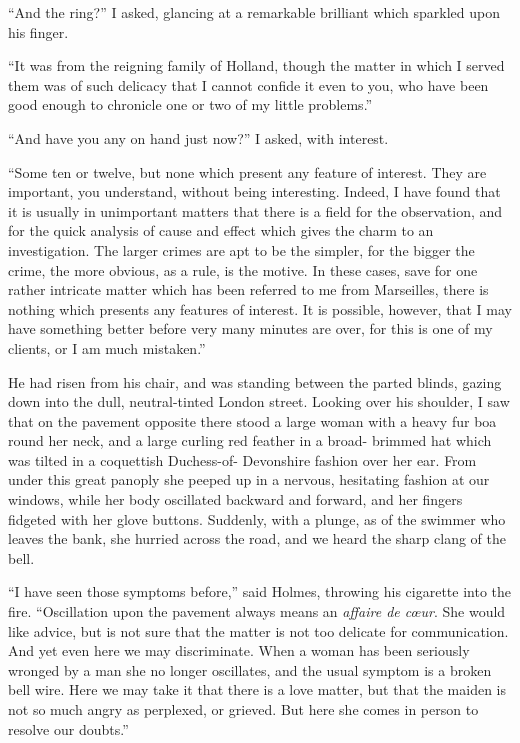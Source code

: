 “And the ring?” I asked, glancing at a remarkable brilliant
which sparkled upon his finger.

“It was from the reigning family of Holland, though the
matter in which I served them was of such delicacy that I
cannot confide it even to you, who have been good enough to
chronicle one or two of my little problems.”

“And have you any on hand just now?” I asked, with
interest.

“Some ten or twelve, but none which present any feature
of interest. They are important, you understand, without being
interesting. Indeed, I have found that it is usually in unimportant
matters that there is a field for the observation,
and for the quick analysis of cause and effect which gives the
charm to an investigation. The larger crimes are apt to be
the simpler, for the bigger the crime, the more obvious, as a
rule, is the motive. In these cases, save for one rather intricate
matter which has been referred to me from Marseilles,
there is nothing which presents any features of interest. It is
possible, however, that I may have something better before
very many minutes are over, for this is one of my clients, or I
am much mistaken.”

He had risen from his chair, and was standing between the
parted blinds, gazing down into the dull, neutral-tinted London
street. Looking over his shoulder, I saw that on the pavement
opposite there stood a large woman with a heavy fur
boa round her neck, and a large curling red feather in a broad-%
brimmed hat which was tilted in a coquettish Duchess-of-%
Devonshire fashion over her ear. From under this great
panoply she peeped up in a nervous, hesitating fashion at our
windows, while her body oscillated backward and forward,
and her fingers fidgeted with her glove buttons. Suddenly,
with a plunge, as of the swimmer who leaves the bank, she
hurried across the road, and we heard the sharp clang of the
bell.

“I have seen those symptoms before,” said Holmes, throwing
his cigarette into the fire. “Oscillation upon the pavement
always means an \textit{affaire de cœur}. She would like advice, but
is not sure that the matter is not too delicate for communication.
And yet even here we may discriminate. When a
woman has been seriously wronged by a man she no longer
oscillates, and the usual symptom is a broken bell wire. Here
we may take it that there is a love matter, but that the maiden
is not so much angry as perplexed, or grieved. But here she
comes in person to resolve our doubts.”

